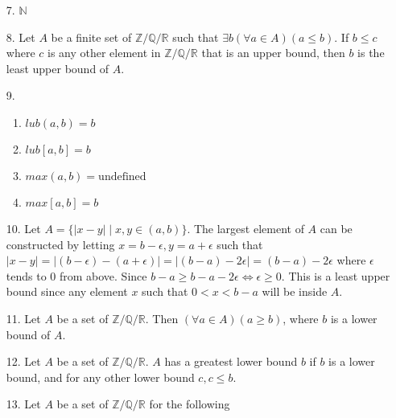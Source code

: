 \documentclass[11pt]{exam}
\begin{document}
\begin{enumerate}[leftmargin=0pt]
\item[7.] $\mathbb{N}$

\item[8.] Let $A$ be a finite set of $\mathbb{Z}/\mathbb{Q}/\mathbb{R}$ such that $\exists b(\forall a \in A)(a \leq b)$. If $b \leq c$ where $c$ is any other element in $\mathbb{Z}/\mathbb{Q}/\mathbb{R}$ that is an upper bound, then $b$ is the least upper bound of $A$.

\item[9.] 
\begin{enumerate}[label = (\alph*)]
    \item $lub(a, b) = b$
    \item $lub[a, b] = b$
    \item $max(a, b) = \text{undefined}$
    \item $max[a, b] = b$
\end{enumerate}

\item[10.] Let $A = \{|x - y| \mid x, y \in (a, b)\}$. The largest element of $A$ can be constructed by letting $x = b - \epsilon, y = a + \epsilon$ such that $|x - y| = |(b - \epsilon) - (a + \epsilon)| = |(b - a) - 2\epsilon| = (b - a) - 2\epsilon$ where $\epsilon$ tends to 0 from above. Since $b - a \geq b - a - 2\epsilon \Leftrightarrow \epsilon \geq 0$. This is a least upper bound since any element $x$ such that $0 < x < b - a$ will be inside $A$.

\item[11.] Let $A$ be a set of $\mathbb{Z}/\mathbb{Q}/\mathbb{R}$. Then $(\forall a \in A)(a \geq b)$, where $b$ is a lower bound of $A$.

\item[12.] Let $A$ be a set of $\mathbb{Z}/\mathbb{Q}/\mathbb{R}$. $A$ has a greatest lower bound $b$ if $b$ is a lower bound, and for any other lower bound $c, c \leq b$.

\item[13.]
Let $A$ be a set of $\mathbb{Z}/\mathbb{Q}/\mathbb{R}$ for the following


\end{enumerate}
\end{document}
